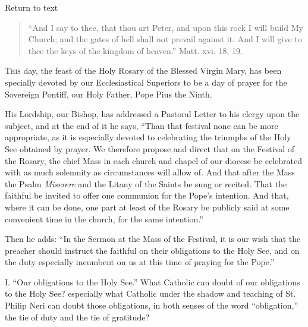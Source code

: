 Return to text


\begin{quote}

``And I say to thee, that thou art Peter, and
upon this rock I will build My Church; and the gates
of hell shall not prevail against it. And I will give
to thee the keys of the kingdom of heaven.''
Matt. xvi. 18, 19.

\end{quote}

T\textsc{his} day, the feast of the Holy Rosary of the Blessed
Virgin Mary, has been specially devoted by our
Ecclesiastical Superiors to be a day of prayer for the
Sovereign Pontiff, our Holy Father, Pope Pius the Ninth.

His Lordship, our Bishop, has addressed a Pastoral
Letter to his clergy upon the subject, and at the end of
it he says, ``Than that festival none can be more
appropriate, as it is especially devoted to celebrating
the triumphs of the Holy See obtained by prayer. We
therefore propose and direct that on the Festival of the
Rosary, the chief Mass in each church and chapel of our
diocese be celebrated with as much solemnity as
circumstances will allow of. And that after the Mass the
Psalm \emph{Miserere} and the Litany of the Saints be
sung or recited. That the faithful be invited to offer
one communion for the Pope's intention. And that, where
it can be done, one part at least of the Rosary be
publicly said at some convenient time in the church, for
the same intention.''

Then he adds: ``In the Sermon at the Mass of the
Festival, it is our wish that the preacher should
instruct the faithful on their obligations to the Holy
See, and on the duty especially incumbent on us at this
time of praying for the Pope.''

I. ``Our obligations to the Holy See.'' What
Catholic can doubt of our obligations to the Holy See?
especially what Catholic under the shadow and teaching of
St. Philip Neri can doubt those obligations, in both
senses of the word ``obligation,'' the tie of
duty and the tie of gratitude?

